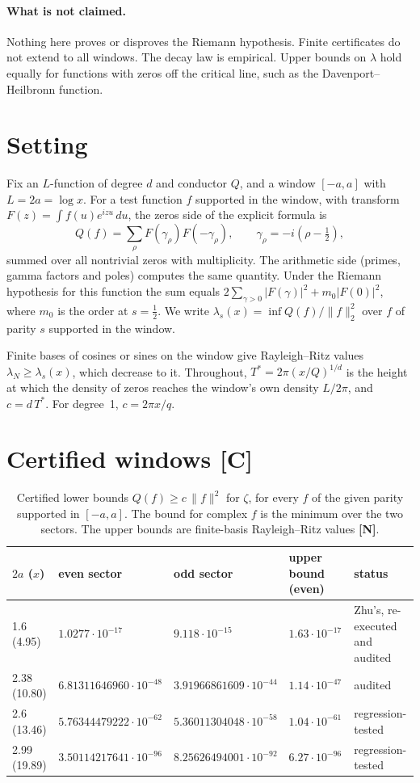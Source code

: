 \documentclass[11pt]{article}
\theoremstyle{remark}
\newcommand{\tagC}{\textbf{[C]}}
\newcommand{\tagN}{\textbf{[N]}}
\begin{document}
\paragraph{What is not claimed.} Nothing here proves or disproves the Riemann hypothesis. Finite certificates do not extend to all windows. The decay law is empirical. Upper bounds on $\lambda$ hold equally for functions with zeros off the critical line, such as the Davenport--Heilbronn function.

\section{Setting}
Fix an $L$-function of degree $d$ and conductor $Q$, and a window $[-a,a]$ with $L=2a=\log x$. For a test function $f$ supported in the window, with transform $F(z)=\int f(u)e^{izu}\,du$, the zeros side of the explicit formula is
\[
Q(f)=\sum_\rho F(\gamma_\rho)F(-\gamma_\rho),\qquad \gamma_\rho=-i(\rho-\tfrac12),
\]
summed over all nontrivial zeros with multiplicity. The arithmetic side (primes, gamma factors and poles) computes the same quantity. Under the Riemann hypothesis for this function the sum equals $2\sum_{\gamma>0}|F(\gamma)|^2+m_0|F(0)|^2$, where $m_0$ is the order at $s=\tfrac12$. We write $\lambda_s(x)=\inf Q(f)/\|f\|_2^2$ over $f$ of parity $s$ supported in the window.

Finite bases of cosines or sines on the window give Rayleigh--Ritz values $\lambda_N\ge\lambda_s(x)$, which decrease to it. Throughout, $T^*=2\pi(x/Q)^{1/d}$ is the height at which the density of zeros reaches the window's own density $L/2\pi$, and $c=d\,T^*$. For degree~1, $c=2\pi x/q$.

\section{Certified windows \tagC}\label{sec:cert}

\begin{table}[h]
\centering\small
\begin{tabular}{@{}llllp{3.0cm}@{}}
\toprule
$2a$ ($x$) & even sector & odd sector & upper bound (even) & status\\
\midrule
1.6 (4.95) & $1.0277\cdot10^{-17}$ & $9.118\cdot10^{-15}$ & $1.63\cdot10^{-17}$ & Zhu's, re-executed and audited\\
2.38 (10.80) & $6.81311646960\cdot10^{-48}$ & $3.91966861609\cdot10^{-44}$ & $1.14\cdot10^{-47}$ & audited\\
2.6 (13.46) & $5.76344479222\cdot10^{-62}$ & $5.36011304048\cdot10^{-58}$ & $1.04\cdot10^{-61}$ & regression-tested\\
2.99 (19.89) & $3.50114217641\cdot10^{-96}$ & $8.25626494001\cdot10^{-92}$ & $6.27\cdot10^{-96}$ & regression-tested\\
\bottomrule
\end{tabular}
\caption{Certified lower bounds $Q(f)\ge c\,\|f\|^2$ for $\zeta$, for every $f$ of the given parity supported in $[-a,a]$. The bound for complex $f$ is the minimum over the two sectors. The upper bounds are finite-basis Rayleigh--Ritz values \tagN.}\label{tab:cert}
\end{table}
\end{document}
